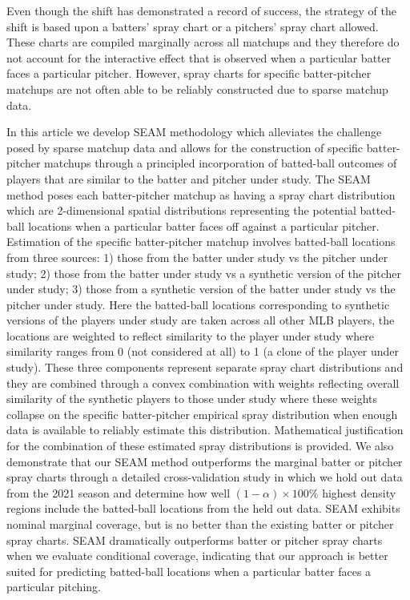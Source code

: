 \documentclass[12pt]{article}
\begin{document}
Even though the shift has demonstrated a record of success, the strategy of the shift is based upon a batters' spray chart or a pitchers' spray chart allowed. These charts are compiled marginally across all matchups and they therefore do not account for the interactive effect that is observed when a particular batter faces a particular pitcher. However, spray charts for specific batter-pitcher matchups are not often able to be reliably constructed due to sparse matchup data. 

In this article we develop SEAM methodology which alleviates the challenge posed by sparse matchup data and allows for the construction of specific batter-pitcher matchups through a principled incorporation of batted-ball outcomes of players that are similar to the batter and pitcher under study. The SEAM method poses each batter-pitcher matchup as having a spray chart distribution which are 2-dimensional spatial distributions representing the potential batted-ball locations when a particular batter faces off against a particular pitcher. %
Estimation of the specific batter-pitcher matchup involves batted-ball locations from three sources: 1) those from the batter under study vs the pitcher under study; 2) those from the batter under study vs a synthetic version of the pitcher under study; 3) those from a synthetic version of the batter under study vs the pitcher under study. Here the batted-ball locations corresponding to synthetic versions of the players under study are taken across all other MLB players, the locations are weighted to reflect similarity to the player under study where similarity ranges from 0 (not considered at all) to 1 (a clone of the player under study). These three components represent separate spray chart distributions and they are combined through a convex combination with weights reflecting overall similarity of the synthetic players to those under study where these weights collapse on the specific batter-pitcher empirical spray distribution when enough data is available to reliably estimate this distribution. Mathematical justification for the combination of these estimated spray distributions is provided. We also demonstrate that our SEAM method outperforms the marginal batter or pitcher spray charts through a detailed cross-validation study in which we hold out data from the 2021 season and determine how well $(1-\alpha)\times 100\%$ highest density regions include the batted-ball locations from the held out data. SEAM exhibits nominal marginal coverage, but is no better than the existing batter or pitcher spray charts. SEAM dramatically outperforms batter or pitcher spray charts when we evaluate conditional coverage, indicating that our approach is better suited for predicting batted-ball locations when a particular batter faces a particular pitching. 
\end{document}
